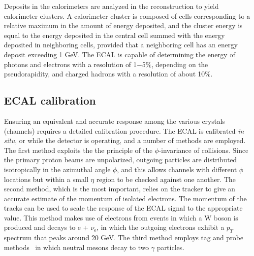 Deposits in the calorimeters are analyzed in the reconstruction to yield calorimeter clusters. A calorimeter cluster is composed of cells corresponding to a relative maximum in the amount of energy deposited, and the cluster energy is equal to the energy deposited in the central cell summed with the energy deposited in neighboring cells, provided that a neighboring cell has an energy deposit exceeding 1 GeV. The ECAL is capable of determining the energy of photons and electrons with a resolution of 1$-$5\%, depending on the pseudorapidity, and charged hadrons with a resolution of about 10\%. 



\subsection{ECAL calibration}
Ensuring an equivalent and accurate response among the various crystals (channels) requires a detailed calibration procedure. The ECAL is calibrated {\it in situ}, or while the detector is operating, and a number of methods are employed. The first method exploits the the principle of the $\phi$-invariance of collisions. Since the primary proton beams are unpolarized, outgoing particles are distributed isotropically in the azimuthal angle $\phi$, and this allows channels with different $\phi$ locations but within a small $\eta$ region to be checked against one another. The second method, which is the most important, relies on the tracker to give an accurate estimate of the momentum of isolated electrons. The momentum of the tracks can be used to scale the response of the ECAL signal to the appropriate value. This method makes use of electrons from events in which a W boson is produced and decays to e + $\nu_{\text{e}}$, in which the outgoing electrons exhibit a $p_T$ spectrum that peaks around 20 GeV. The third method employs tag and probe methods~\cite{Beaudette:2014cea} in which neutral mesons decay to two $\gamma$ particles. 

